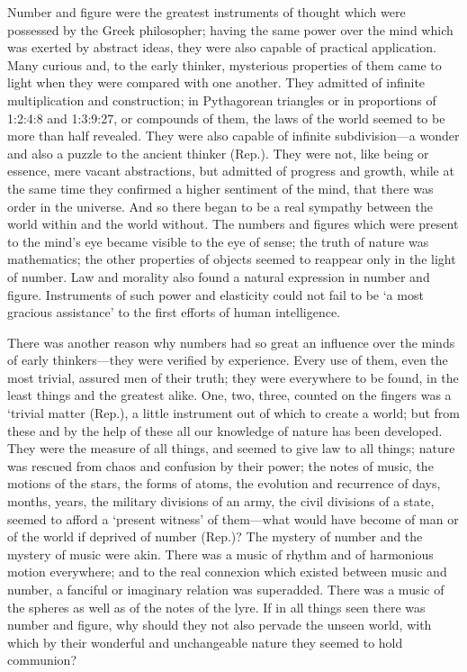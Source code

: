 \documentclass[11pt,letter]{article}
\begin{document}
\par  Number and figure were the greatest instruments of thought which were possessed by the Greek philosopher; having the same power over the mind which was exerted by abstract ideas, they were also capable of practical application. Many curious and, to the early thinker, mysterious properties of them came to light when they were compared with one another. They admitted of infinite multiplication and construction; in Pythagorean triangles or in proportions of 1:2:4:8 and 1:3:9:27, or compounds of them, the laws of the world seemed to be more than half revealed. They were also capable of infinite subdivision—a wonder and also a puzzle to the ancient thinker (Rep.). They were not, like being or essence, mere vacant abstractions, but admitted of progress and growth, while at the same time they confirmed a higher sentiment of the mind, that there was order in the universe. And so there began to be a real sympathy between the world within and the world without. The numbers and figures which were present to the mind’s eye became visible to the eye of sense; the truth of nature was mathematics; the other properties of objects seemed to reappear only in the light of number. Law and morality also found a natural expression in number and figure. Instruments of such power and elasticity could not fail to be ‘a most gracious assistance’ to the first efforts of human intelligence.

\par  There was another reason why numbers had so great an influence over the minds of early thinkers—they were verified by experience. Every use of them, even the most trivial, assured men of their truth; they were everywhere to be found, in the least things and the greatest alike. One, two, three, counted on the fingers was a ‘trivial matter (Rep.), a little instrument out of which to create a world; but from these and by the help of these all our knowledge of nature has been developed. They were the measure of all things, and seemed to give law to all things; nature was rescued from chaos and confusion by their power; the notes of music, the motions of the stars, the forms of atoms, the evolution and recurrence of days, months, years, the military divisions of an army, the civil divisions of a state, seemed to afford a ‘present witness’ of them—what would have become of man or of the world if deprived of number (Rep.)? The mystery of number and the mystery of music were akin. There was a music of rhythm and of harmonious motion everywhere; and to the real connexion which existed between music and number, a fanciful or imaginary relation was superadded. There was a music of the spheres as well as of the notes of the lyre. If in all things seen there was number and figure, why should they not also pervade the unseen world, with which by their wonderful and unchangeable nature they seemed to hold communion?
\end{document}
